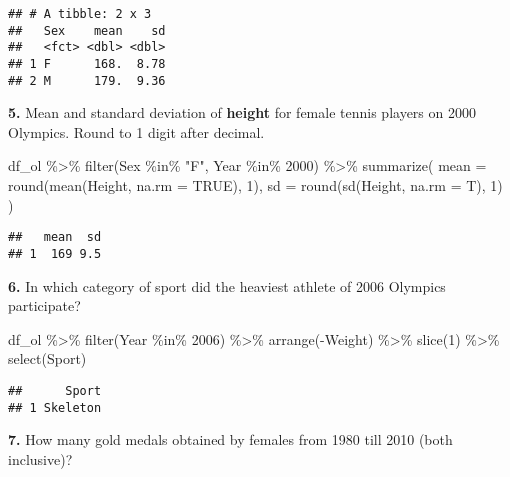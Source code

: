 \documentclass[
]{article}
\newenvironment{Shaded}{\begin{snugshade}}{\end{snugshade}}
\newcommand{\AttributeTok}[1]{\textcolor[rgb]{0.77,0.63,0.00}{#1}}
\newcommand{\ConstantTok}[1]{\textcolor[rgb]{0.00,0.00,0.00}{#1}}
\newcommand{\DecValTok}[1]{\textcolor[rgb]{0.00,0.00,0.81}{#1}}
\newcommand{\FunctionTok}[1]{\textcolor[rgb]{0.00,0.00,0.00}{#1}}
\newcommand{\NormalTok}[1]{#1}
\newcommand{\SpecialCharTok}[1]{\textcolor[rgb]{0.00,0.00,0.00}{#1}}
\newcommand{\StringTok}[1]{\textcolor[rgb]{0.31,0.60,0.02}{#1}}
\begin{document}
\begin{verbatim}
## # A tibble: 2 x 3
##   Sex    mean    sd
##   <fct> <dbl> <dbl>
## 1 F      168.  8.78
## 2 M      179.  9.36
\end{verbatim}

\textbf{5. } Mean and standard deviation of \textbf{height} for female
tennis players on 2000 Olympics. Round to 1 digit after decimal.

\begin{Shaded}
\begin{Highlighting}[]
\NormalTok{df\_ol }\SpecialCharTok{\%\textgreater{}\%} \FunctionTok{filter}\NormalTok{(Sex }\SpecialCharTok{\%in\%} \StringTok{"F"}\NormalTok{, Year }\SpecialCharTok{\%in\%} \DecValTok{2000}\NormalTok{) }\SpecialCharTok{\%\textgreater{}\%} 
  \FunctionTok{summarize}\NormalTok{(}
    \AttributeTok{mean =} \FunctionTok{round}\NormalTok{(}\FunctionTok{mean}\NormalTok{(Height, }\AttributeTok{na.rm =} \ConstantTok{TRUE}\NormalTok{), }\DecValTok{1}\NormalTok{),  }\AttributeTok{sd =} \FunctionTok{round}\NormalTok{(}\FunctionTok{sd}\NormalTok{(Height, }\AttributeTok{na.rm =}\NormalTok{ T), }\DecValTok{1}\NormalTok{)}
\NormalTok{  )}
\end{Highlighting}
\end{Shaded}

\begin{verbatim}
##   mean  sd
## 1  169 9.5
\end{verbatim}

\textbf{6. }In which category of sport did the heaviest athlete of 2006
Olympics participate?

\begin{Shaded}
\begin{Highlighting}[]
\NormalTok{df\_ol }\SpecialCharTok{\%\textgreater{}\%} \FunctionTok{filter}\NormalTok{(Year }\SpecialCharTok{\%in\%} \DecValTok{2006}\NormalTok{) }\SpecialCharTok{\%\textgreater{}\%} 
  \FunctionTok{arrange}\NormalTok{(}\SpecialCharTok{{-}}\NormalTok{Weight) }\SpecialCharTok{\%\textgreater{}\%} 
  \FunctionTok{slice}\NormalTok{(}\DecValTok{1}\NormalTok{) }\SpecialCharTok{\%\textgreater{}\%} 
  \FunctionTok{select}\NormalTok{(Sport)}
\end{Highlighting}
\end{Shaded}

\begin{verbatim}
##      Sport
## 1 Skeleton
\end{verbatim}

\textbf{7. }How many gold medals obtained by females from 1980 till 2010
(both inclusive)?
\end{document}
